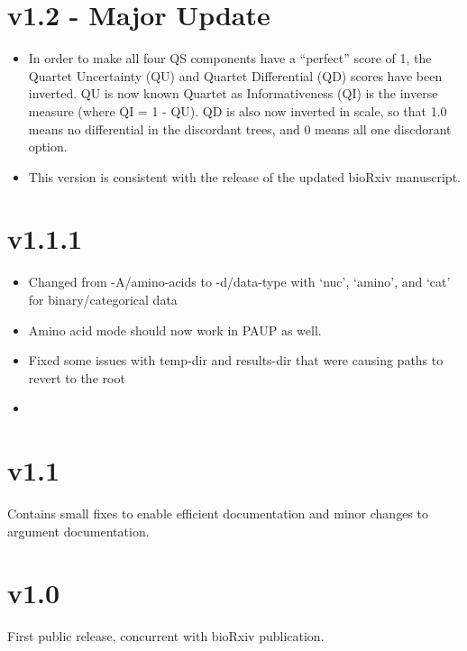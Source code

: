 \documentclass[letterpaper,12pt,english]{sphinxmanual}
\begin{document}
\section{v1.2 - Major Update}
\label{\detokenize{releases:v1-2-major-update}}\begin{itemize}
\item {} 
In order to make all four QS components have a “perfect” score of 1, the Quartet Uncertainty (QU) and Quartet Differential (QD) scores have been inverted. QU is now known Quartet as Informativeness (QI) is the inverse measure (where QI = 1 - QU).  QD is also now inverted in scale, so that 1.0 means no differential in the discordant trees, and 0 means all one discdorant option.

\item {} 
This version is consistent with the release of the updated bioRxiv manuscript.

\end{itemize}


\section{v1.1.1}
\label{\detokenize{releases:v1-1-1}}\begin{itemize}
\item {} 
Changed from -A/\textendash{}amino-acids to -d/\textendash{}data-type with ‘nuc’, ‘amino’, and ‘cat’ for binary/categorical data

\item {} 
Amino acid mode should now work in PAUP as well.

\item {} 
Fixed some issues with temp-dir and results-dir that were causing paths to revert to the root

\item {} 

\end{itemize}


\section{v1.1}
\label{\detokenize{releases:v1-1}}
Contains small fixes to enable efficient documentation and minor changes to argument documentation.


\section{v1.0}
\label{\detokenize{releases:v1-0}}
First public release, concurrent with bioRxiv publication.



\renewcommand{\indexname}{Index}
\printindex
\end{document}
